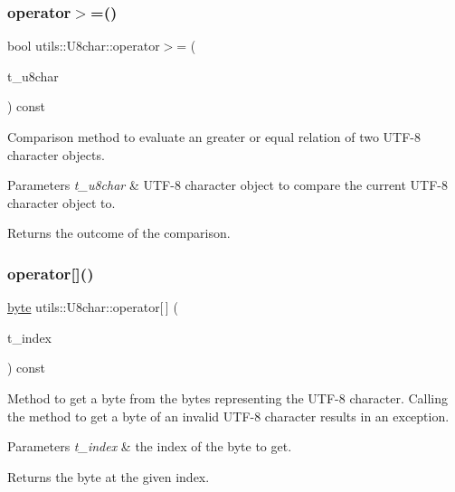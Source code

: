 \subsubsection{\texorpdfstring{operator$>$=()}{operator>=()}}
{\footnotesize\ttfamily bool utils\+::\+U8char\+::operator$>$= (\begin{DoxyParamCaption}\item[{\hyperlink{classutils_1_1U8char}{U8char} const \&}]{t\+\_\+u8char }\end{DoxyParamCaption}) const}

Comparison method to evaluate an \textquotesingle{}greater or equal\textquotesingle{} relation of two U\+T\+F-\/8 character objects. 
\begin{DoxyParams}{Parameters}
{\em t\+\_\+u8char} & U\+T\+F-\/8 character object to compare the current U\+T\+F-\/8 character object to. \\
\hline
\end{DoxyParams}
\begin{DoxyReturn}{Returns}
the outcome of the comparison. 
\end{DoxyReturn}
\mbox{\label{classutils_1_1U8char_ae161e7637c19413fbc0a639fb5e43e45}} 
\subsubsection{\texorpdfstring{operator[]()}{operator[]()}}
{\footnotesize\ttfamily \hyperlink{namespaceutils_a6ec9293c5f79998946269edb0f6bc028}{byte} utils\+::\+U8char\+::operator\mbox{[}$\,$\mbox{]} (\begin{DoxyParamCaption}\item[{int}]{t\+\_\+index }\end{DoxyParamCaption}) const}

Method to get a byte from the bytes representing the U\+T\+F-\/8 character. Calling the method to get a byte of an invalid U\+T\+F-\/8 character results in an exception. 
\begin{DoxyParams}{Parameters}
{\em t\+\_\+index} & the index of the byte to get. \\
\hline
\end{DoxyParams}
\begin{DoxyReturn}{Returns}
the byte at the given index. 
\end{DoxyReturn}
\mbox{\label{classutils_1_1U8char_a493954b5b9a0bcad32f55a67ec2c4de1}} 
